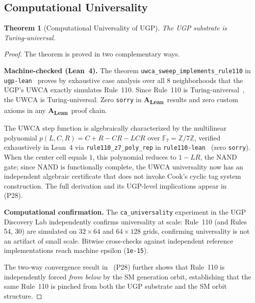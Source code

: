 \documentclass[11pt]{article}
\newcommand{\CatAL}{\textbf{A\textsubscript{Lean}}}
\newtheorem{theorem}{Theorem}[section]
\begin{document}
\subsection{Computational Universality}
\begin{theorem}[Computational Universality of UGP]
The UGP substrate is Turing-universal.
\end{theorem}
\begin{proof}
The theorem is proved in two complementary ways.

\textbf{Machine-checked (Lean~4).} The theorem \texttt{uwca\_sweep\_implements\_rule110} in \texttt{ugp-lean}~\cite{ugp-lean} proves by exhaustive case analysis over all 8 neighborhoods that the UGP's UWCA exactly simulates Rule~110. Since Rule~110 is Turing-universal~\cite{Cook2004,Wolfram1984}, the UWCA is Turing-universal. Zero \texttt{sorry} in \CatAL\ results and zero custom axioms in any \CatAL\ proof chain.

The UWCA step function is algebraically characterized by the multilinear polynomial $p(L,C,R) = C+R-CR-LCR$ over $\mathbb{F}_7 = \mathbb{Z}/7\mathbb{Z}$, verified exhaustively in Lean~4 via \texttt{rule110\_z7\_poly\_rep} in \texttt{rule110-lean}~\cite{rule110-lean} (zero \texttt{sorry}). When the center cell equals $1$, this polynomial reduces to $1-LR$, the NAND gate; since NAND is functionally complete, the UWCA universality now has an independent algebraic certificate that does not invoke Cook's cyclic tag system construction. The full derivation and its UGP-level implications appear in~\cite{SpivackCompUniversality} (P28).

\textbf{Computational confirmation.} The \texttt{ca\_universality} experiment in the UGP Discovery Lab independently confirms universality at scale: Rule~110 (and Rules 54, 30) are simulated on $32\times 64$ and $64\times 128$ grids, confirming universality is not an artifact of small scale. Bitwise cross-checks against independent reference implementations reach machine epsilon (\texttt{1e-15}).

The two-way convergence result in~\cite{SpivackCompUniversality} (P28) further shows that Rule~110 is independently forced \emph{from below} by the SM generation orbit, establishing that the same Rule~110 is pinched from both the UGP substrate and the SM orbit structure.
\end{proof}
\end{document}
